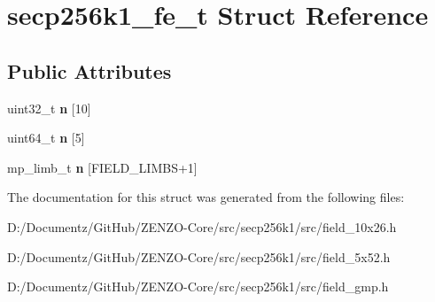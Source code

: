 \hypertarget{structsecp256k1__fe__t}{}\section{secp256k1\+\_\+fe\+\_\+t Struct Reference}
\label{structsecp256k1__fe__t}
\subsection*{Public Attributes}
\begin{DoxyCompactItemize}
\item 
\mbox{\label{structsecp256k1__fe__t_a998e2427a7ee5c6a6842cae3fd9d158b}} 
uint32\+\_\+t {\bfseries n} \mbox{[}10\mbox{]}
\item 
\mbox{\label{structsecp256k1__fe__t_a619a2a961744b3517b6bd9c672667413}} 
uint64\+\_\+t {\bfseries n} \mbox{[}5\mbox{]}
\item 
\mbox{\label{structsecp256k1__fe__t_aa5eb5b775f108fd2ebd22b0162813e83}} 
mp\+\_\+limb\+\_\+t {\bfseries n} \mbox{[}F\+I\+E\+L\+D\+\_\+\+L\+I\+M\+BS+1\mbox{]}
\end{DoxyCompactItemize}


The documentation for this struct was generated from the following files\+:\begin{DoxyCompactItemize}
\item 
D\+:/\+Documentz/\+Git\+Hub/\+Z\+E\+N\+Z\+O-\/\+Core/src/secp256k1/src/field\+\_\+10x26.\+h\item 
D\+:/\+Documentz/\+Git\+Hub/\+Z\+E\+N\+Z\+O-\/\+Core/src/secp256k1/src/field\+\_\+5x52.\+h\item 
D\+:/\+Documentz/\+Git\+Hub/\+Z\+E\+N\+Z\+O-\/\+Core/src/secp256k1/src/field\+\_\+gmp.\+h\end{DoxyCompactItemize}
